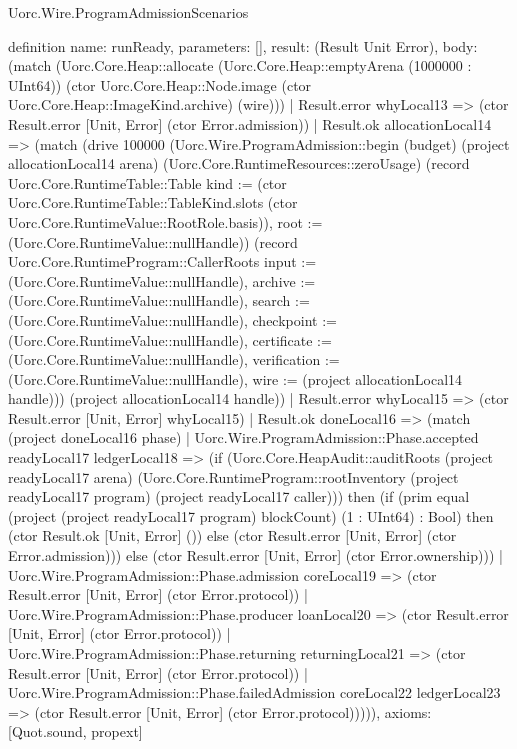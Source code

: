 \begin{lexlean}{Uorc.Wire.ProgramAdmissionScenarios}
\begin{semanticmodule}
definition{
  name: runReady,
  parameters: [],
  result: (Result Unit Error),
  body: (match (Uorc.Core.Heap::allocate (Uorc.Core.Heap::emptyArena (1000000 : UInt64)) (ctor Uorc.Core.Heap::Node.image (ctor Uorc.Core.Heap::ImageKind.archive) (wire)))
    | Result.error whyLocal13 => (ctor Result.error [Unit, Error] (ctor Error.admission))
    | Result.ok allocationLocal14 => (match (drive 100000 (Uorc.Wire.ProgramAdmission::begin (budget) (project allocationLocal14 arena) (Uorc.Core.RuntimeResources::zeroUsage) (record Uorc.Core.RuntimeTable::Table {kind := (ctor Uorc.Core.RuntimeTable::TableKind.slots (ctor Uorc.Core.RuntimeValue::RootRole.basis)), root := (Uorc.Core.RuntimeValue::nullHandle)}) (record Uorc.Core.RuntimeProgram::CallerRoots {input := (Uorc.Core.RuntimeValue::nullHandle), archive := (Uorc.Core.RuntimeValue::nullHandle), search := (Uorc.Core.RuntimeValue::nullHandle), checkpoint := (Uorc.Core.RuntimeValue::nullHandle), certificate := (Uorc.Core.RuntimeValue::nullHandle), verification := (Uorc.Core.RuntimeValue::nullHandle), wire := (project allocationLocal14 handle)})) (project allocationLocal14 handle))
      | Result.error whyLocal15 => (ctor Result.error [Unit, Error] whyLocal15)
      | Result.ok doneLocal16 => (match (project doneLocal16 phase)
        | Uorc.Wire.ProgramAdmission::Phase.accepted readyLocal17 ledgerLocal18 => (if (Uorc.Core.HeapAudit::auditRoots (project readyLocal17 arena) (Uorc.Core.RuntimeProgram::rootInventory (project readyLocal17 program) (project readyLocal17 caller))) then (if (prim equal (project (project readyLocal17 program) blockCount) (1 : UInt64) : Bool) then (ctor Result.ok [Unit, Error] ()) else (ctor Result.error [Unit, Error] (ctor Error.admission))) else (ctor Result.error [Unit, Error] (ctor Error.ownership)))
        | Uorc.Wire.ProgramAdmission::Phase.admission coreLocal19 => (ctor Result.error [Unit, Error] (ctor Error.protocol))
        | Uorc.Wire.ProgramAdmission::Phase.producer loanLocal20 => (ctor Result.error [Unit, Error] (ctor Error.protocol))
        | Uorc.Wire.ProgramAdmission::Phase.returning returningLocal21 => (ctor Result.error [Unit, Error] (ctor Error.protocol))
        | Uorc.Wire.ProgramAdmission::Phase.failedAdmission coreLocal22 ledgerLocal23 => (ctor Result.error [Unit, Error] (ctor Error.protocol))))),
  axioms: [Quot.sound, propext]
}


\end{semanticmodule}
\end{lexlean}
